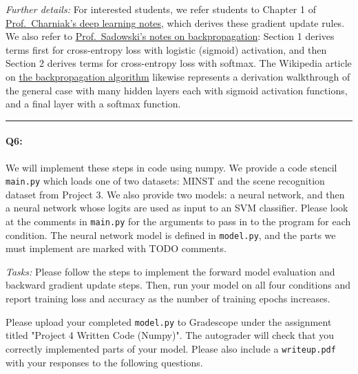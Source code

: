 \emph{Further details:} For interested students, we refer students to Chapter 1 of \href{https://cs.brown.edu/courses/csci1460/assets/files/deep-learning.pdf}{Prof.~Charniak's deep learning notes}, which derives these gradient update rules. We also refer to \href{https://www.ics.uci.edu/~pjsadows/notes.pdf}{Prof.~Sadowski's notes on backpropagation}: Section 1 derives terms first for cross-entropy loss with logistic (sigmoid) activation, and then Section 2 derives terms for cross-entropy loss with softmax. The Wikipedia article on \href{https://en.wikipedia.org/wiki/Backpropagation}{the backpropagation algorithm} likewise represents a derivation walkthrough of the general case with many hidden layers each with sigmoid activation functions, and a final layer with a softmax function.

\hspace{\fill}\rule{0.5\linewidth}{.5pt}\hspace{\fill}


\paragraph{Q6:} We will implement these steps in code using numpy. We provide a code stencil \texttt{main.py} which loads one of two datasets: MINST and the scene recognition dataset from Project 3. We also provide two models: a neural network, and then a neural network whose logits are used as input to an SVM classifier. Please look at the comments in \texttt{main.py} for the arguments to pass in to the program for each condition. The neural network model is defined in \texttt{model.py}, and the parts we must implement are marked with TODO comments.

\emph{Tasks:} Please follow the steps to implement the forward model evaluation and backward gradient update steps. Then, run your model on all four conditions and report training loss and accuracy as the number of training epochs increases.


Please upload your completed \texttt{model.py} to Gradescope under the assignment titled "Project 4 Written Code (Numpy)". The autograder will check that you correctly implemented parts of your model. Please also include a \texttt{writeup.pdf} with your responses to the following questions.

